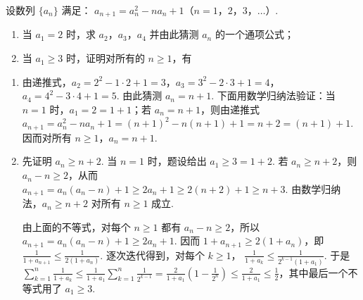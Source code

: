 \begin{problem}
设数列 \(\{a_{n}\}\) 满足： \(a_{n + 1} = a_n^2 - n a_n + 1\)（\(n = 1\)，\(2\)，\(3\)，\(\dots\)）.

\begin{enumerate}
\item 当 \(a_{1} = 2\) 时，求 \(a_{2}\)，\(a_{3}\)，\(a_{4}\) 并由此猜测 \(a_{n}\) 的一个通项公式；
\item 当 \(a_{1} \geqslant 3\) 时，证明对所有的 \(n \geqslant 1\)，有
\end{enumerate}
\end{problem}

\begin{solution}
\begin{enumerate}
\item 由递推式，\(\displaystyle a_2=2^2-1\cdot2+1=3\)，\(\displaystyle a_3=3^2-2\cdot3+1=4\)，\(\displaystyle a_4=4^2-3\cdot4+1=5\). 由此猜测 \(a_n=n+1\). 下面用数学归纳法验证：当 \(n=1\) 时，\(a_1=2=1+1\)；若 \(a_n=n+1\)，则由递推式
\(\displaystyle a_{n+1}=a_n^2-na_n+1=(n+1)^2-n(n+1)+1=n+2=(n+1)+1\). 因而对所有 \(n\geqslant1\)，\(a_n=n+1\).
\item 先证明 \(a_n\geqslant n+2\). 当 \(n=1\) 时，题设给出 \(a_1\geqslant3=1+2\). 若 \(a_n\geqslant n+2\)，则 \(a_n-n\geqslant2\)，从而
\(\displaystyle a_{n+1}=a_n(a_n-n)+1\geqslant2a_n+1\geqslant2(n+2)+1\geqslant n+3\). 由数学归纳法，\(a_n\geqslant n+2\) 对所有 \(n\geqslant1\) 成立.

由上面的不等式，对每个 \(n\geqslant1\) 都有 \(a_n-n\geqslant2\)，所以 \(\displaystyle a_{n+1}=a_n(a_n-n)+1\geqslant2a_n+1\). 因而
\(\displaystyle 1+a_{n+1}\geqslant2(1+a_n)\)，即 \(\displaystyle\frac1{1+a_{n+1}}\leqslant\frac1{2(1+a_n)}\). 逐次迭代得到，对每个 \(k\geqslant1\)，
\(\displaystyle\frac1{1+a_k}\leqslant\frac1{2^{k-1}(1+a_1)}\). 于是
\(\displaystyle\sum_{k=1}^{n}\frac1{1+a_k}\leqslant\frac1{1+a_1}\sum_{k=1}^{n}\frac1{2^{k-1}}=\frac2{1+a_1}\left(1-\frac1{2^n}\right)\leqslant\frac2{1+a_1}\leqslant\frac12\)，其中最后一个不等式用了 \(a_1\geqslant3\).
\end{enumerate}
\end{solution}
